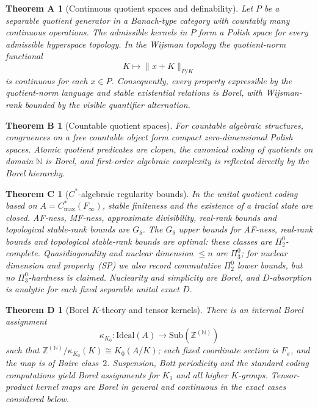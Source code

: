 \documentclass[12pt,fleqn,a4paper]{amsart}
\renewcommand{\le}{\leqslant}
\numberwithin{equation}{section}
\newtheorem*{theoremA}{Theorem A}
\newtheorem*{theoremB}{Theorem B}
\newtheorem*{theoremC}{Theorem C}
\newtheorem*{theoremD}{Theorem D}
\theoremstyle{definition}
\newcommand{\Ideal}{\mathrm{Ideal}}
\newcommand{\Sub}{\mathrm{Sub}}
\begin{document}
\begin{theoremA}[Continuous quotient spaces and definability]
Let $P$ be a separable quotient generator in a Banach-type category with countably many
continuous operations.  The admissible kernels in $P$ form a Polish space for every
admissible hyperspace topology.  In the Wijsman topology the quotient-norm functional
\[
        K\longmapsto \|x+K\|_{P/K}
\]
is continuous for each $x\in P$.  Consequently, every property expressible by the
quotient-norm language and stable existential relations is Borel, with Wijsman-rank
bounded by the visible quantifier alternation.
\end{theoremA}

\begin{theoremB}[Countable quotient spaces]
For countable algebraic structures, congruences on a free countable object form compact
zero-dimensional Polish spaces.  Atomic quotient predicates are clopen, the canonical
coding of quotients on domain $\mathbb N$ is Borel, and first-order algebraic
complexity is reflected directly by the Borel hierarchy.
\end{theoremB}

\begin{theoremC}[$C^*$-algebraic regularity bounds]
In the unital quotient coding based on $A=C^*_{\max}(F_\infty)$, stable finiteness
and the existence of a tracial state are closed.  AF-ness, MF-ness, approximate
divisibility, real-rank bounds and topological stable-rank bounds are $G_\delta$.
The $G_\delta$ upper bounds for AF-ness, real-rank bounds and topological stable-rank
bounds are optimal: these classes are $\Pi^0_2$-complete.  Quasidiagonality and
nuclear dimension $\le n$ are $\Pi^0_3$; for nuclear dimension and property~(SP) we
also record commutative $\Pi^0_2$ lower bounds, but no $\Pi^0_3$-hardness is claimed.
Nuclearity and simplicity are Borel, and $D$-absorption is analytic for each fixed
separable unital exact $D$.
\end{theoremC}

\begin{theoremD}[Borel $K$-theory and tensor kernels]
There is an internal Borel assignment
\[
        \kappa_{K_0}:\Ideal(A)\longrightarrow \Sub(\mathbb Z^{(\mathbb N)})
\]
such that $\mathbb Z^{(\mathbb N)}/\kappa_{K_0}(K)\cong K_0(A/K)$; each fixed
coordinate section is $F_\sigma$, and the map is of Baire class~$2$.  Suspension,
Bott periodicity and the standard coding computations yield Borel assignments for
$K_1$ and all higher $K$-groups.  Tensor-product kernel maps are Borel in general and
continuous in the exact cases considered below.
\end{theoremD}
\end{document}
